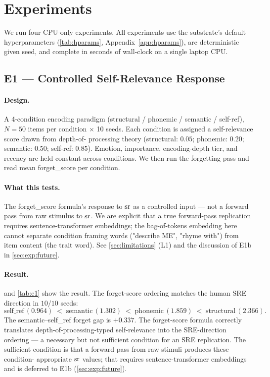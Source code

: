 \section{Experiments}
\label{sec:exp}

We run four CPU-only experiments. All experiments use the substrate's
default hyperparameters (\cref{tab:hparams}, Appendix~\ref{app:hparams}),
are deterministic given seed, and complete in seconds of wall-clock on a
single laptop CPU.

\subsection{E1 --- Controlled Self-Relevance Response}
\label{sec:exp:e1}

\paragraph{Design.}
A 4-condition encoding paradigm (structural / phonemic / semantic /
self-ref), $N=50$ items per condition $\times$ 10 seeds. Each
condition is assigned a self-relevance score drawn from depth-of-
processing theory (\textsf{structural}: $0.05$; \textsf{phonemic}:
$0.20$; \textsf{semantic}: $0.50$; \textsf{self-ref}: $0.85$).
Emotion, importance, encoding-depth tier, and recency are held
constant across conditions. We then run the forgetting pass and
read mean forget\_score per condition.

\paragraph{What this tests.}
The forget\_score formula's response to $\mathrm{sr}$ as a controlled input
--- not a forward pass from raw stimulus to $\mathrm{sr}$. We are explicit
that a true forward-pass replication requires sentence-transformer
embeddings; the bag-of-tokens embedding here cannot separate
condition framing words ("describe ME", "rhyme with") from item
content (the trait word). See \cref{sec:limitations} (L1) and the
discussion of E1b in \cref{sec:exp:future}.

\paragraph{Result.}
 and \cref{tab:e1} show the result. The forget-score
ordering matches the human SRE direction in $10/10$ seeds:
\[
\text{self\_ref}\,(0.964)
\;<\; \text{semantic}\,(1.302)
\;<\; \text{phonemic}\,(1.859)
\;<\; \text{structural}\,(2.366).
\]
The semantic--self\_ref forget gap is $\mathbf{+0.337}$.
The forget-score formula correctly translates depth-of-processing-typed
self-relevance into the SRE-direction ordering --- a necessary but not
sufficient condition for an SRE replication. The sufficient condition
is that a forward pass from raw stimuli produces these condition-
appropriate $\mathrm{sr}$ values; that requires sentence-transformer
embeddings and is deferred to E1b (\cref{sec:exp:future}).


